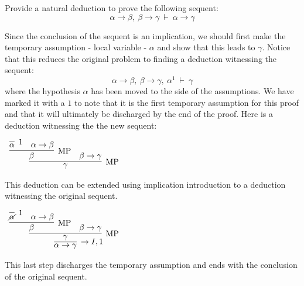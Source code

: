 \documentclass{book}
\begin{document}
    \begin{eg}

        Provide a natural deduction to prove the following sequent: $$\alpha \to \beta, \ \beta \to \gamma \ \vdash \ \alpha \to \gamma $$

        Since the conclusion of the sequent is an implication, we should first make the temporary assumption - local variable - $\alpha$ and show that this leads to $\gamma$. Notice that this reduces the original problem to finding a deduction witnessing the sequent: $$\alpha \to \beta, \ \beta \to \gamma, \ \alpha^{1} \ \vdash \ \gamma $$
        where the hypothesis $\alpha$ has been moved to the side of the assumptions. We have marked it with a $1$ to note that it is the first temporary assumption for this proof and that it will ultimately be discharged by the end of the proof. Here is a deduction witnessing the the new sequent: 

        \begin{center}
            $\begin{array}{c}
                \infer[\MP]{\gamma}
                        {\infer[\MP]{\beta}
                            {\infer[1]{\alpha}{} & \alpha \to \beta}
                        &
                        \beta \to \gamma}
            \end{array}$
        \end{center}

        This deduction can be extended using implication introduction to a deduction witnessing the original sequent. 
	
        \begin{center}
            $\begin{array}{c}
                \infer[\to I,1]{\alpha \to \gamma}
                    {\infer[\MP]{\gamma}
                        {\infer[\MP]{\beta}
                            {\infer[1]{\cancel{\alpha}}{} & \alpha \to \beta}
                        &
                        \beta \to \gamma}}
            \end{array}$
        \end{center}

        This last step discharges the temporary assumption and ends with the conclusion of the original sequent.
    \end{eg}

    \begin{eg} [I Combinator]
        
    \end{eg}
\end{document}
